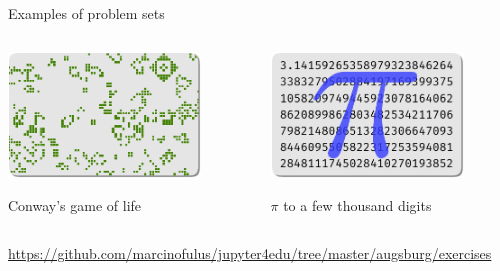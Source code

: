 \documentclass[svgnames]{beamer}
\begin{document}
\begin{frame}{Examples of problem sets}
 \begin{columns}[t]
  \begin{column}{0.5\textwidth}
   \begin{center}
    \includegraphics[width=0.8\textwidth]{conway}

    Conway's game of life
   \end{center}
  \end{column}%
  \begin{column}{0.5\textwidth}
   \begin{center}
    \includegraphics[width=0.8\textwidth]{pi}

    $\pi$ to a few thousand digits
   \end{center}
  \end{column}%
 \end{columns}

 \vspace{0.4truecm}
 {\scriptsize\url{https://github.com/marcinofulus/jupyter4edu/tree/master/augsburg/exercises}}
\end{frame}
\end{document}
